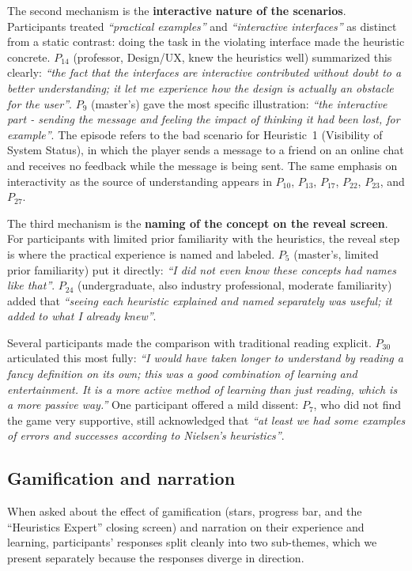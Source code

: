 The second mechanism is the \textbf{interactive nature of the scenarios}. Participants treated \textit{``practical examples''} and \textit{``interactive interfaces''} as distinct from a static contrast: doing the task in the violating interface made the heuristic concrete. $P_{14}$ (professor, Design/UX, knew the heuristics well) summarized this clearly: \textit{``the fact that the interfaces are interactive contributed without doubt to a better understanding; it let me experience how the design is actually an obstacle for the user''}. $P_9$ (master's) gave the most specific illustration: \textit{``the interactive part - sending the message and feeling the impact of thinking it had been lost, for example''}. The episode refers to the bad scenario for Heuristic~1 (Visibility of System Status), in which the player sends a message to a friend on an online chat and receives no feedback while the message is being sent. The same emphasis on interactivity as the source of understanding appears in $P_{10}$, $P_{13}$, $P_{17}$, $P_{22}$, $P_{23}$, and $P_{27}$.

The third mechanism is the \textbf{naming of the concept on the reveal screen}. For participants with limited prior familiarity with the heuristics, the reveal step is where the practical experience is named and labeled. $P_5$ (master's, limited prior familiarity) put it directly: \textit{``I did not even know these concepts had names like that''}. $P_{24}$ (undergraduate, also industry professional, moderate familiarity) added that \textit{``seeing each heuristic explained and named separately was useful; it added to what I already knew''}.

Several participants made the comparison with traditional reading explicit. $P_{30}$ articulated this most fully: \textit{``I would have taken longer to understand by reading a fancy definition on its own; this was a good combination of learning and entertainment. It is a more active method of learning than just reading, which is a more passive way.''} One participant offered a mild dissent: $P_7$, who did not find the game very supportive, still acknowledged that \textit{``at least we had some examples of errors and successes according to Nielsen's heuristics''}.

\subsection{Gamification and narration}
\label{sec:results:t3}

When asked about the effect of gamification (stars, progress bar, and the ``Heuristics Expert'' closing screen) and narration on their experience and learning, participants' responses split cleanly into two sub-themes, which we present separately because the responses diverge in direction.

